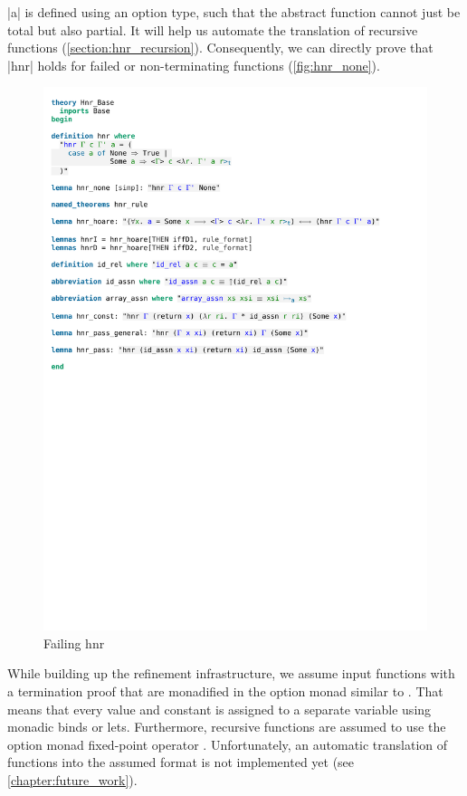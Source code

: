 \noindent |a| is defined using an option type, such that the abstract function cannot just be total but also partial. It will help us automate the translation of recursive functions (\autoref{section:hnr_recursion}).
Consequently, we can directly prove that |hnr| holds for failed or non-terminating functions (\autoref{fig:hnr_none}).

\begin{figure}[htpb]
    \includegraphics[trim={0 23,8cm 0 5,2cm}, clip, width=1.00\textwidth]{figures/Theory_Hnr_Base.pdf}
    \caption[Failing hnr]{Failing hnr}
    \label{fig:hnr_none}
\end{figure}

\noindent While building up the refinement infrastructure, we assume input functions with a termination proof that are monadified in the option monad similar to \cite{Wimmer_2018}. That means that every value and constant is assigned to a separate variable using monadic binds or lets. Furthermore, recursive functions are assumed to use the option monad fixed-point operator \parencite[p.5]{Krauss_2010}. Unfortunately, an automatic translation of functions into the assumed format is not implemented yet (see \autoref{chapter:future_work}).

